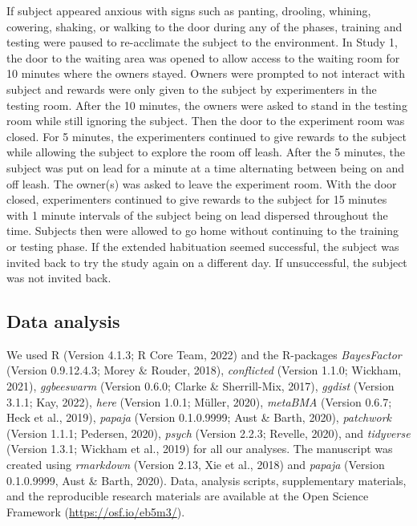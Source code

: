 \documentclass[
  pub,floatsintext]{apa6}
\begin{document}
If subject appeared anxious with signs such as panting, drooling, whining, cowering, shaking, or walking to the door during any of the phases, training and testing were paused to re-acclimate the subject to the environment. In Study 1, the door to the waiting area was opened to allow access to the waiting room for 10 minutes where the owners stayed. Owners were prompted to not interact with subject and rewards were only given to the subject by experimenters in the testing room. After the 10 minutes, the owners were asked to stand in the testing room while still ignoring the subject. Then the door to the experiment room was closed. For 5 minutes, the experimenters continued to give rewards to the subject while allowing the subject to explore the room off leash. After the 5 minutes, the subject was put on lead for a minute at a time alternating between being on and off leash. The owner(s) was asked to leave the experiment room. With the door closed, experimenters continued to give rewards to the subject for 15 minutes with 1 minute intervals of the subject being on lead dispersed throughout the time. Subjects then were allowed to go home without continuing to the training or testing phase. If the extended habituation seemed successful, the subject was invited back to try the study again on a different day. If unsuccessful, the subject was not invited back.

\hypertarget{data-analysis}{%
\subsection{Data analysis}\label{data-analysis}}

We used R (Version 4.1.3; R Core Team, 2022) and the R-packages \emph{BayesFactor} (Version 0.9.12.4.3; Morey \& Rouder, 2018), \emph{conflicted} (Version 1.1.0; Wickham, 2021), \emph{ggbeeswarm} (Version 0.6.0; Clarke \& Sherrill-Mix, 2017), \emph{ggdist} (Version 3.1.1; Kay, 2022), \emph{here} (Version 1.0.1; Müller, 2020), \emph{metaBMA} (Version 0.6.7; Heck et al., 2019), \emph{papaja} (Version 0.1.0.9999; Aust \& Barth, 2020), \emph{patchwork} (Version 1.1.1; Pedersen, 2020), \emph{psych} (Version 2.2.3; Revelle, 2020), and \emph{tidyverse} (Version 1.3.1; Wickham et al., 2019) for all our analyses. The manuscript was created using \emph{rmarkdown} (Version 2.13, Xie et al., 2018) and \emph{papaja} (Version 0.1.0.9999, Aust \& Barth, 2020). Data, analysis scripts, supplementary materials, and the reproducible research materials are available at the Open Science Framework (\url{https://osf.io/eb5m3/}).
\end{document}
